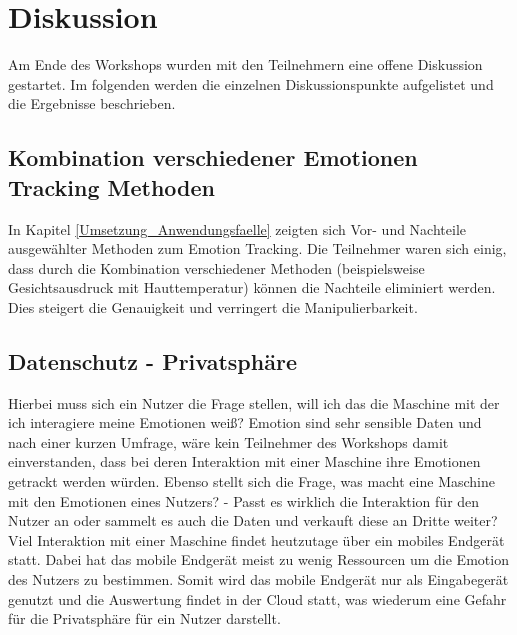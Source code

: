 \section{Diskussion}
Am Ende des Workshops wurden mit den Teilnehmern eine offene Diskussion gestartet. Im folgenden werden die einzelnen Diskussionspunkte aufgelistet und die Ergebnisse beschrieben.

\subsection{Kombination verschiedener Emotionen Tracking Methoden}
In Kapitel \ref{Umsetzung_Anwendungsfaelle} zeigten sich Vor- und Nachteile ausgewählter Methoden zum Emotion Tracking. Die Teilnehmer waren sich einig, dass durch die Kombination verschiedener Methoden (beispielsweise Gesichtsausdruck mit Hauttemperatur) können die Nachteile eliminiert werden. Dies steigert die Genauigkeit und verringert die Manipulierbarkeit.

\subsection{Datenschutz - Privatsphäre}
Hierbei muss sich ein Nutzer die Frage stellen, will ich das die Maschine mit der ich interagiere meine Emotionen weiß? Emotion sind sehr sensible Daten und nach einer kurzen Umfrage, wäre kein Teilnehmer des Workshops damit einverstanden, dass bei deren Interaktion mit einer Maschine ihre Emotionen getrackt werden würden. Ebenso stellt sich die Frage, was macht eine Maschine mit den Emotionen eines Nutzers? - Passt es wirklich die Interaktion für den Nutzer an oder sammelt es auch die Daten und verkauft diese an Dritte weiter? Viel Interaktion mit einer Maschine findet heutzutage über ein mobiles Endgerät statt. Dabei hat das mobile Endgerät meist zu wenig Ressourcen um die Emotion des Nutzers zu bestimmen. Somit wird das mobile Endgerät nur als Eingabegerät genutzt und die Auswertung findet in der Cloud statt, was wiederum eine Gefahr für die Privatsphäre für ein Nutzer darstellt.

